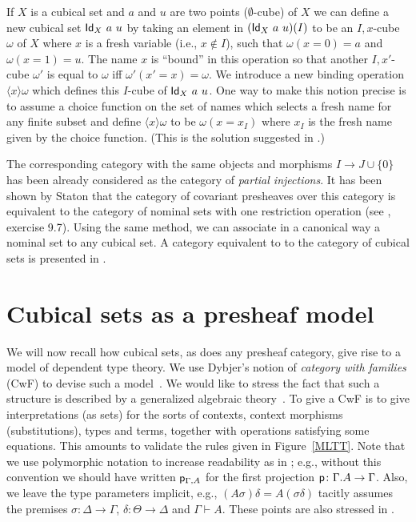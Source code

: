 \documentclass[10pt,a4paper]{article}
\newcommand{\Id}{{\sf Id}}
\newcommand{\pp}{{\sf p}}
\newcommand{\set}[1]{\{#1\}}
\newcommand{\es}{\emptyset}
\newcommand{\bind}[2]{{\langle}#1{\rangle}#2}
\begin{document}
 If $X$ is a cubical set and $a$ and $u$ are two points ($\es$-cube) of $X$ we can define a new cubical set $\Id_X~a~u$
by taking an element in $(\Id_X~a~u)(I)$ to be an $I,x$-cube $\omega$ of $X$ where $x$ is
a fresh variable (i.e., $x \notin I$), such that $\omega(x=0) = a$ and $\omega(x=1) = u$. The name $x$ is ``bound''
in this operation so that another $I,x'$-cube $\omega'$ is equal to $\omega$
if{f} $\omega'(x'=x) = \omega$.
We introduce a new binding operation $\bind{x}{\omega}$ which defines this $I$-cube of $\Id_X~a~u$.
One way to make this notion precise is to assume a choice function
on the set of names which selects a fresh name for any finite subset and define $\bind{x}{\omega}$ to be $\omega (x=x_I)$ where
$x_I$ is the fresh name given by the choice function. (This is the solution suggested in \cite{Stoughton}.)

\medskip

 The corresponding category with the same objects and morphisms $I \to J\cup\{0\}$ has been already
considered as the category of {\em partial injections}. It has been shown by Staton that the category of covariant
presheaves over this category is equivalent to the category of nominal sets with one restriction operation
(see \cite{pitts}, exercise 9.7). Using the same method, we can associate in a canonical way a nominal set
to any cubical set. A category equivalent to to the category of cubical sets is presented in \cite{Pitts}.

\section{Cubical sets as a presheaf model}
\label{sec:presheaf-models}

We will now recall how cubical sets, as does any presheaf category,
give rise to a model of dependent type theory.  We use Dybjer's notion
of \emph{category with families} (CwF) to devise such a
model~\cite{Dybjer,Curien,Hofmann}.  We would like to stress the fact
that such a structure is described by a generalized algebraic
theory~\cite{Cartmell}.  To give a CwF is to give interpretations (as
sets) for the sorts of contexts, context morphisms (substitutions),
types and terms, together with operations satisfying some equations.
This amounts to validate the rules given in Figure~\ref{MLTT}.  Note
that we use polymorphic notation to increase readability as in
\cite{Cartmell,Dybjer}; e.g., without this convention we should have
written $\pp_{\Gamma, A}$ for the first projection $\pp \colon
\Gamma.A \to \Gamma$.  Also, we leave the type parameters implicit,
e.g., $(A \sigma) \delta = A (\sigma \delta)$ tacitly assumes the
premises $\sigma \colon \Delta \to \Gamma$, $\delta \colon \Theta \to
\Delta$ and $\Gamma \vdash A$.  These points are also stressed in
\cite[Sec.~1]{VoevodskyCMU}.
\end{document}
